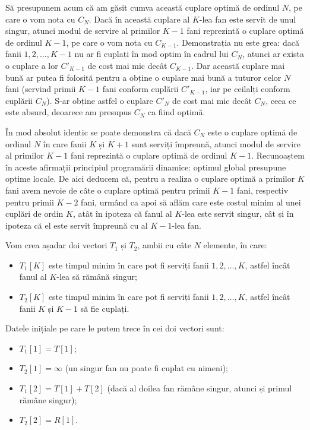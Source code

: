 Să presupunem acum că am găsit cumva această cuplare optimă de ordinul $N$, pe
care o vom nota cu $C_N$. Dacă în această cuplare al $K$-lea fan este servit
de unul singur, atunci modul de servire al primilor $K-1$ fani reprezintă o
cuplare optimă de ordinul $K-1$, pe care o vom nota cu $C_{K-1}$. Demonstrația
nu este grea: dacă fanii $1, 2, \dots, K-1$ nu ar fi cuplați în mod optim în
cadrul lui $C_N$, atunci ar exista o cuplare a lor $C'_{K-1}$ de cost mai mic
decât $C_{K-1}$. Dar această cuplare mai bună ar putea fi folosită pentru a
obține o cuplare mai bună a tuturor celor $N$ fani (servind primii $K-1$ fani
conform cuplării $C'_{K-1}$, iar pe ceilalți conform cuplării $C_N$). S-ar
obține astfel o cuplare $C'_N$ de cost mai mic decât $C_N$, ceea ce este
absurd, deoarece am presupus $C_N$ ca fiind optimă.

În mod absolut identic se poate demonstra că dacă $C_N$ este o cuplare optimă
de ordinul $N$ în care fanii $K$ și $K+1$ sunt serviți împreună, atunci modul
de servire al primilor $K-1$ fani reprezintă o cuplare optimă de ordinul
$K-1$. Recunoaștem în aceste afirmații principiul programării dinamice:
optimul global presupune optime locale. De aici deducem că, pentru a realiza o
cuplare optimă a primilor $K$ fani avem nevoie de câte o cuplare optimă pentru
primii $K-1$ fani, respectiv pentru primii $K-2$ fani, urmând ca apoi să aflăm
care este costul minim al unei cuplări de ordin $K$, atât în ipoteza că fanul
al $K$-lea este servit singur, cât și în ipoteza că el este servit împreună cu
al $K-1$-lea fan.

Vom crea așadar doi vectori $T_1$ și $T_2$, ambii cu câte $N$ elemente, în
care:

\begin{itemize}

\item $T_1[K]$ este timpul minim în care pot fi serviți fanii $1, 2, \dots,
  K$, astfel încât fanul al $K$-lea să rămână singur;

\item $T_2[K]$ este timpul minim în care pot fi serviți fanii $1, 2, \dots,
  K$, astfel încât fanii $K$ și $K-1$ să fie cuplați.

\end{itemize}

Datele inițiale pe care le putem trece în cei doi vectori sunt:

\begin{itemize}

\item $T_1[1] = T[1]$;

\item $T_2[1] = \infty$ (un singur fan nu poate fi cuplat cu nimeni);

\item $T_1[2] = T[1]+T[2]$ (dacă al doilea fan rămâne singur, atunci și primul
  rămâne singur);

\item $T_2[2] = R[1]$.

\end{itemize}

